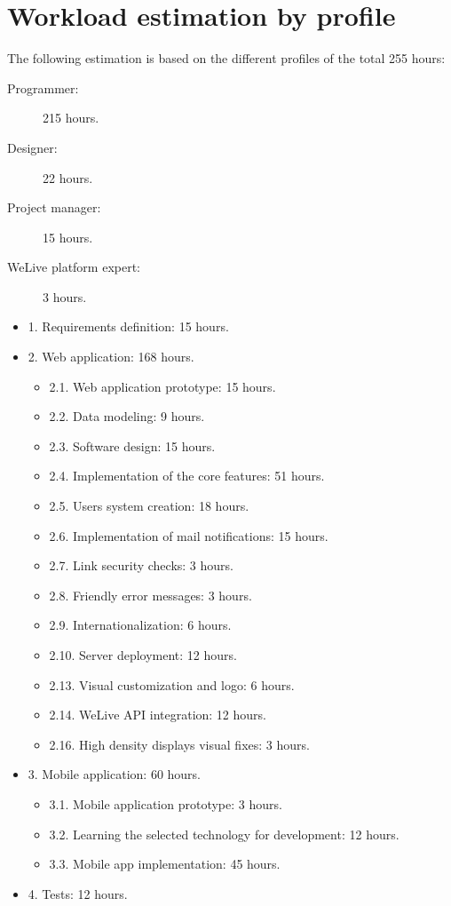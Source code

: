 \documentclass{DeustoFDP}
\begin{document}
\section{Workload estimation by profile}
The following estimation is based on the different profiles of the total 255 hours:
\begin{description}
	\item[Programmer:] 215 hours.
	\item[Designer:] 22 hours.
	\item[Project manager:] 15 hours.
	\item[WeLive platform expert:] 3 hours.
\end{description}

\begin{itemize}
	\item 1. Requirements definition: 15 hours.
	\item 2. Web application: 168 hours.
	\begin{itemize}
		\item 2.1. Web application prototype: 15 hours.
		\item 2.2. Data modeling: 9 hours.
		\item 2.3. Software design: 15 hours.
		\item 2.4. Implementation of the core features: 51 hours.
		\item 2.5. Users system creation: 18 hours.
		\item 2.6. Implementation of mail notifications: 15 hours.
		\item 2.7. Link security checks: 3 hours.
		\item 2.8. Friendly error messages: 3 hours.
		\item 2.9. Internationalization: 6 hours.
		\item 2.10. Server deployment: 12 hours.
		\item 2.13. Visual customization and logo: 6 hours.
		\item 2.14. WeLive API integration: 12 hours.
		\item 2.16. High density displays visual fixes: 3 hours.
	\end{itemize}
	\item 3. Mobile application: 60 hours.
	\begin{itemize}
		\item 3.1. Mobile application prototype: 3 hours.
		\item 3.2. Learning the selected technology for development: 12 hours.
		\item 3.3. Mobile app implementation: 45 hours.
	\end{itemize}
	\item 4. Tests: 12 hours.
\end{itemize}
\end{document}
